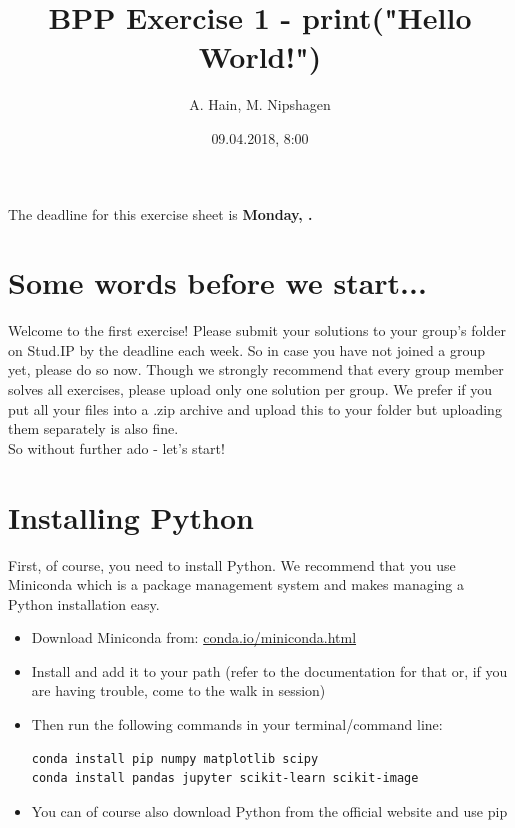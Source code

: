 \documentclass{article}
\title{BPP Exercise 1 - print("Hello World!")}
\author{A. Hain, M. Nipshagen}
\date{09.04.2018, 8:00}
\makeatletter
\let\thedate\@date
\makeatother
\begin{document}
The deadline for this exercise sheet is \textbf{Monday, \thedate.}

\section*{Some words before we start...}
Welcome to the first exercise! Please submit your solutions to your group's folder
on Stud.IP by the deadline each week. So in case you have not joined a group yet,
please do so now. Though we strongly recommend that every group member solves all
exercises, please upload only one solution per group. We prefer if
you put all your files into a .zip archive and upload this to your folder but
uploading them separately is also fine.\\
So without further ado - let's start!

\section{Installing Python}
First, of course, you need to install Python. We recommend that you use Miniconda
which is a package management system and makes managing a Python installation easy.

\begin{itemize}
\item Download Miniconda from: \href{conda.io/miniconda.html​}{conda.io/miniconda.html}
\item Install and add it to your path (refer to the documentation for that or, if you are having trouble,
come to the walk in session)
\item Then run the following commands in your terminal/command line:
\begin{lstlisting}
conda install pip numpy matplotlib scipy
conda install pandas jupyter scikit-learn scikit-image
\end{lstlisting}
\item You can of course also download Python from the official website and use pip
\end{itemize}


\end{document}
